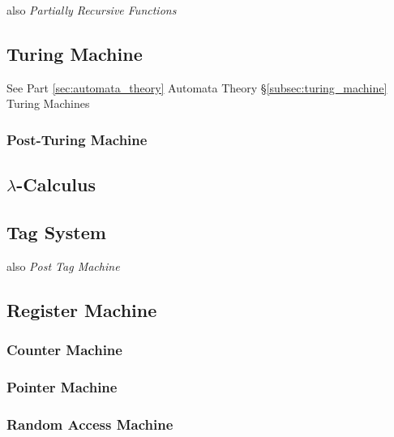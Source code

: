 \documentclass{article}
\begin{document}
also \emph{Partially Recursive Functions}

\subsection{Turing Machine}

See Part \ref{sec:automata_theory} Automata Theory
\S\ref{subsec:turing_machine} Turing Machines

\subsubsection{Post-Turing Machine}\label{subsec:post_turing}

\subsection{$\lambda$-Calculus}\label{subsec:lambda_calculus}

\subsection{Tag System}\label{subsec:tag_system}

also \emph{Post Tag Machine}

\subsection{Register Machine}\label{subsec:register_machine}

\subsubsection{Counter Machine}

\subsubsection{Pointer Machine}

\subsubsection{Random Access Machine}
\end{document}
